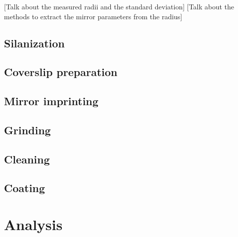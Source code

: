 [Talk about the measured radii and the standard deviation]
[Talk about the methods to extract the mirror parameters from the radius]
\subsection{Silanization}
\subsection{Coverslip preparation}
\subsection{Mirror imprinting}
\subsection{Grinding}
\subsection{Cleaning}
\subsection{Coating}
\section{Analysis}